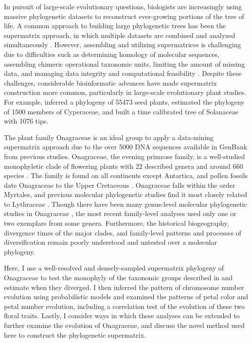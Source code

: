 \documentclass[review]{elsarticle}
\begin{document}
In pursuit of large-scale evolutionary questions,
biologists are increasingly using massive phylogenetic
datasets to reconstruct ever-growing portions of the tree of life. 
A common approach to building large phylogenetic trees has been
the supermatrix approach, in which multiple datasets are
combined and analyzed simultaneously \citep{DeQueiroz2007}.
However, assembling and utilizing supermatrices is challenging
due to difficulties such as determining homology of molecular
sequences, assembling chimeric operational taxonomic units, 
limiting the amount of missing data,
and managing data integrity and computational feasibility \citep{Roure2007, Yan2005}.
Despite these challenges, considerable bioinformatic advances 
have made supermatrix construction more common,
particularly in large-scale evolutionary plant studies.
For example, \citet{Smith2011}
inferred a phylogeny of 55473 seed plants,
\citet{Hinchliff2013} estimated the phylogeny of 1500 members of Cyperaceae,
and \citet{Sarkinen2013} built a time calibrated tree of Solanaceae with 1076 tips.

The plant family Onagraceae is an
ideal group to apply a data-mining supermatrix approach
due to the over 5000 DNA sequences available in GenBank from previous studies.
Onagraceae, the evening primrose family, is a well-studied 
monophyletic clade
of flowering plants with 22 described genera and around 660 species \citep{wagner2007revised}.
The family is found on all continents except Antartica,
and pollen fossils date Onagraceae to the Upper Cretaceous \citep{grimsson}.
Onagraceae falls within the order Myrtales,
and previous molecular phylogenetic studies find it most closely related to Lythraceae \citep{conti1997, Sytsma2004}.
Though there have been many genus-level molecular phylogenetic studies in Onagraceae
\citep{Berry2004, Evans2009, Hoggard2004, Xie2009, Baum1994, Wagner2005}, 
the most recent family-level analyses \citep{Levin2003, Levin2004}
used only one or two exemplars from some genera. 
Furthermore, the historical biogeography, divergence times of the major clades, and 
family-level patterns and processes of diversification remain poorly understood
and untested over a molecular phylogeny.

Here, I use a well-resolved and densely-sampled supermatrix phylogeny of Onagraceae to
test the monophyly of the taxonomic groups described in \citet{wagner2007revised}
and estimate when they diverged.
I then inferred the pattern of chromosome number evolution using probabilistic models and
examined the patterns of petal color and petal number evolution, 
including a correlation test of the evolution of these two floral traits.
Lastly, I consider ways in which these analyses can be extended
to further examine the evolution of Onagraceae, 
and discuss the novel method used here to construct the phylogenetic supermatrix.
\end{document}
